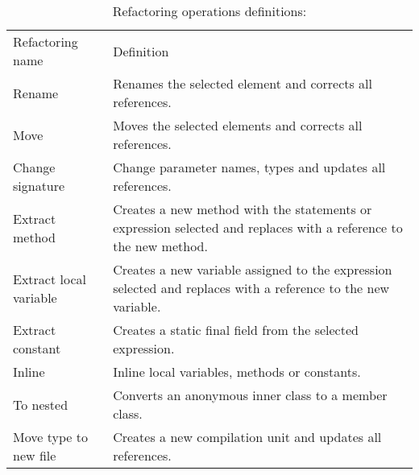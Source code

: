 \begin{table}[htbp]
\caption{Refactoring operations definitions:}
\label{tab-Refactoring-Definitions}
\begin{tabular}{ p{2.95cm}| p{9.15cm}}
\hline\noalign{\smallskip}
Refactoring name 		  & Definition \\
\noalign{\smallskip}
\hline
\noalign{\smallskip}
Rename                    & Renames the selected element and corrects all references.                                                                                                                 \\ \hline
Move                      & Moves the selected elements and corrects all references.                                                                                                                  \\ \hline
Change signature          & Change parameter names, types and updates all references.                                                                                                                 \\ \hline
Extract method            & Creates a new method with the statements or expression selected and replaces with a reference to the new method.                                                          \\ \hline
Extract local variable    & Creates a new variable assigned to the expression selected and replaces with a reference to the new variable.                                                             \\ \hline
Extract constant          & Creates a static final field from the selected expression.                                                                                                                \\ \hline
Inline                    & Inline local variables, methods or constants.                                                                                                                             \\ \hline
To nested                 & Converts an anonymous inner class to a member class.                                                                                                                      \\ \hline
Move type to new file     & Creates a new compilation unit and updates all references.                                                                                                                \\ \hline

\end{tabular}
\end{table}
